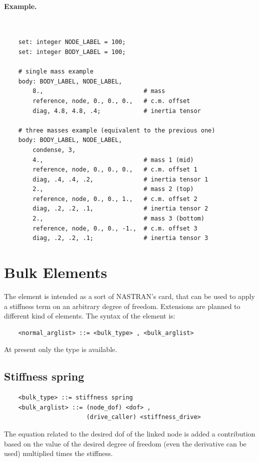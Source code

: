 \paragraph{Example.} \
\begin{verbatim}
    set: integer NODE_LABEL = 100;
    set: integer BODY_LABEL = 100;

    # single mass example
    body: BODY_LABEL, NODE_LABEL,
        8.,                            # mass
        reference, node, 0., 0., 0.,   # c.m. offset
        diag, 4.8, 4.8, .4;            # inertia tensor

    # three masses example (equivalent to the previous one)
    body: BODY_LABEL, NODE_LABEL,
        condense, 3,
        4.,                            # mass 1 (mid)
        reference, node, 0., 0., 0.,   # c.m. offset 1
        diag, .4, .4, .2,              # inertia tensor 1
        2.,                            # mass 2 (top)
        reference, node, 0., 0., 1.,   # c.m. offset 2
        diag, .2, .2, .1,              # inertia tensor 2
        2.,                            # mass 3 (bottom)
        reference, node, 0., 0., -1.,  # c.m. offset 3
        diag, .2, .2, .1;              # inertia tensor 3
\end{verbatim}

\section{Bulk Elements}
The  element is intended as a sort of NASTRAN's  card,
that can be used to apply a stiffness term on an arbitrary degree of freedom.
Extensions are planned to different kind of elements.
The syntax of the  element is:
\begin{verbatim}
    <normal_arglist> ::= <bulk_type> , <bulk_arglist>
\end{verbatim}
At present only the  type is available.

\subsection{Stiffness spring}
\begin{verbatim}
    <bulk_type> ::= stiffness spring
    <bulk_arglist> ::= (node_dof) <dof> ,
                       (drive_caller) <stiffness_drive>
\end{verbatim}
The equation related to the desired dof of the linked node is added a
contribution based on the value of the desired degree of freedom (even the
derivative can be used) multiplied times the stiffness.

